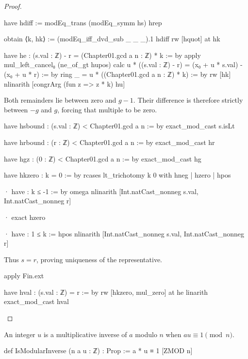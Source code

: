 \begin{proof}
\begin{lean}
    have hdiff := modEq_trans (modEq_symm hs) hrep

    obtain ⟨k, hk⟩ := (modEq_iff_dvd_sub _ _ _).1 hdiff
    rw [hquot] at hk

    have he : (s.val : ℤ) - r = (Chapter01.gcd a n : ℤ) * k := by
      apply mul_left_cancel₀ (ne_of_gt hupos)
      calc
        u * ((s.val : ℤ) - r) = (x₀ + u * s.val) - (x₀ + u * r) := by ring
        _ = u * ((Chapter01.gcd a n : ℤ) * k) := by
          rw [hk]
          nlinarith [congrArg (fun z => z * k) hu]
  \end{lean}

  Both remainders lie between zero and $g-1$.
  Their difference is therefore strictly between $-g$ and $g$, forcing that multiple to be zero.

  \begin{lean}
    have hsbound : (s.val : ℤ) < Chapter01.gcd a n := by
      exact_mod_cast s.isLt

    have hrbound : (r : ℤ) < Chapter01.gcd a n := by
      exact_mod_cast hr

    have hgz : (0 : ℤ) < Chapter01.gcd a n := by
      exact_mod_cast hg

    have hkzero : k = 0 := by
      rcases lt_trichotomy k 0 with hneg | hzero | hpos

      · have : k ≤ -1 := by
          omega
        nlinarith [Int.natCast_nonneg s.val, Int.natCast_nonneg r]

      · exact hzero

      · have : 1 ≤ k := hpos
        nlinarith [Int.natCast_nonneg s.val, Int.natCast_nonneg r]
  \end{lean}

  Thus $s=r$, proving uniqueness of the representative.

  \begin{lean}
    apply Fin.ext

    have hval : (s.val : ℤ) = r := by
      rw [hkzero, mul_zero] at he
      linarith
    exact_mod_cast hval
  \end{lean}
\end{proof}

\begin{definition}
  An integer $u$ is a multiplicative inverse of $a$ modulo $n$ when $au\equiv1\pmod n$.

  \begin{lean}
    def IsModularInverse (n a u : ℤ) : Prop := a * u ≡ 1 [ZMOD n]
  \end{lean}
\end{definition}

